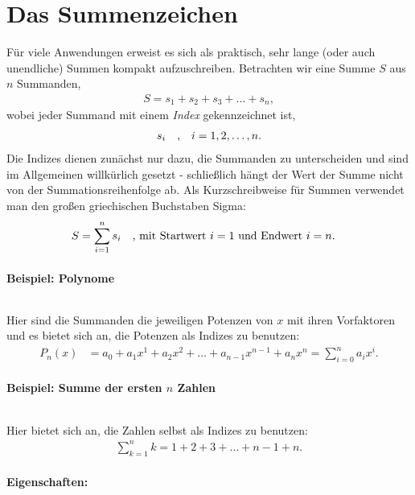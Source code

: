 \thispagestyle{plain}
\section{Das Summenzeichen}

Für viele Anwendungen erweist es sich als praktisch, sehr lange (oder auch unendliche) Summen kompakt aufzuschreiben. Betrachten wir eine Summe $S$ aus $n$ Summanden, 
\begin{align}
    S = s_1 + s_2 + s_3 + \hdots + s_n,
\end{align}
wobei jeder Summand mit einem \emph{Index} gekennzeichnet ist, 
\begin{align}
    s_i \qq{,} i=1,2,\hdots,n.
\end{align}
Die Indizes dienen zunächst nur dazu, die Summanden zu unterscheiden und sind im Allgemeinen willkürlich gesetzt - schließlich hängt der Wert der Summe nicht von der Summationsreihenfolge ab. Als Kurzschreibweise für Summen verwendet man den großen griechischen Buchstaben Sigma:
\begin{align}
    S = \sum_{i=1}^n s_i \qq{, mit Startwert $i=1$ und Endwert $i=n$.} 
\end{align}

\paragraph{Beispiel: Polynome}$~$

Hier sind die Summanden die jeweiligen Potenzen von $x$ mit ihren Vorfaktoren und es bietet sich an, die Potenzen als Indizes zu benutzen: 
\begin{align}
    P_n(x) &= a_0 + a_1 x^1 + a_2 x^2 + \hdots + a_{n-1} x^{n-1} + a_n x^n  = \sum_{i=0}^n a_i x^i.
\end{align}

\paragraph{Beispiel: Summe der ersten $n$ Zahlen}$~$

Hier bietet sich an, die Zahlen selbst als Indizes zu benutzen: 
\begin{align}
    \sum_{k=1}^n k = 1 + 2 + 3 + \hdots + n-1 +n.
\end{align}

\paragraph{Eigenschaften:}$~$

